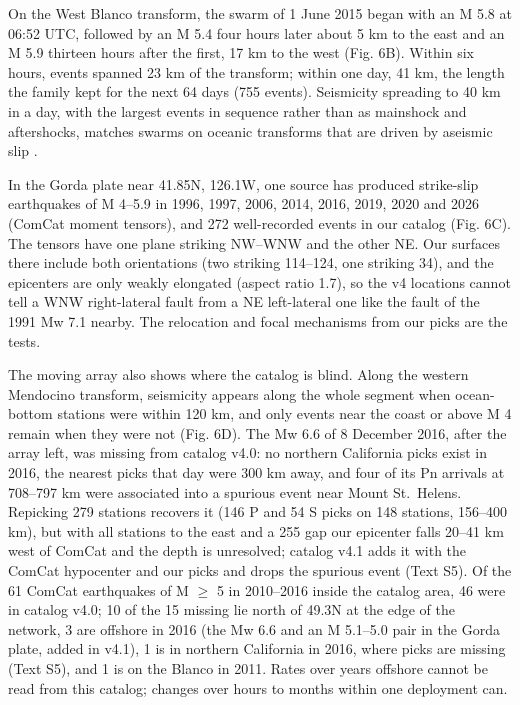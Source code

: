 \documentclass[11pt]{article}
\begin{document}
On the West Blanco transform, the swarm of 1 June 2015 began with an M
5.8 at 06:52 UTC, followed by an M 5.4 four hours later about 5 km to
the east and an M 5.9 thirteen hours after the first, 17 km to the west
(Fig. 6B). Within six hours, events spanned 23 km of the transform;
within one day, 41 km, the length the family kept for the next 64 days
(755 events). Seismicity spreading to 40 km in a day, with the largest
events in sequence rather than as mainshock and aftershocks, matches
swarms on oceanic transforms that are driven by aseismic slip
\citep{McGuire2005, Roland2009}.

In the Gorda plate near 41.85\textdegree{}N, 126.1\textdegree{}W, one source has produced
strike-slip earthquakes of M 4--5.9 in 1996, 1997, 2006, 2014, 2016,
2019, 2020 and 2026 (ComCat moment tensors), and 272 well-recorded
events in our catalog (Fig. 6C). The tensors have one plane striking
NW--WNW and the other NE. Our surfaces there include both orientations
(two striking 114--124\textdegree{}, one striking 34\textdegree{}), and the epicenters are only
weakly elongated (aspect ratio 1.7), so the v4 locations cannot tell a
WNW right-lateral fault from a NE left-lateral one like the fault of the
1991 Mw 7.1 nearby. The relocation and focal mechanisms from our picks
are the tests.

The moving array also shows where the catalog is blind. Along the
western Mendocino transform, seismicity appears along the whole segment
when ocean-bottom stations were within 120 km, and only events near the
coast or above M 4 remain when they were not (Fig. 6D). The Mw 6.6 of 8
December 2016, after the array left, was missing from catalog v4.0: no
northern California picks exist in 2016, the nearest picks that day were
300 km away, and four of its Pn arrivals at 708--797 km were associated
into a spurious event near Mount St.~Helens. Repicking 279 stations
recovers it (146 P and 54 S picks on 148 stations, 156--400 km), but
with all stations to the east and a 255\textdegree{} gap our epicenter falls 20--41
km west of ComCat and the depth is unresolved; catalog v4.1 adds it with
the ComCat hypocenter and our picks and drops the spurious event (Text
S5). Of the 61 ComCat earthquakes of M \ensuremath{\geq} 5 in 2010--2016 inside the
catalog area, 46 were in catalog v4.0; 10 of the 15 missing lie north of
49.3\textdegree{}N at the edge of the network, 3 are offshore in 2016 (the Mw 6.6
and an M 5.1--5.0 pair in the Gorda plate, added in v4.1), 1 is in
northern California in 2016, where picks are missing (Text S5), and 1 is
on the Blanco in 2011. Rates over years offshore cannot be read from
this catalog; changes over hours to months within one deployment can.
\end{document}

